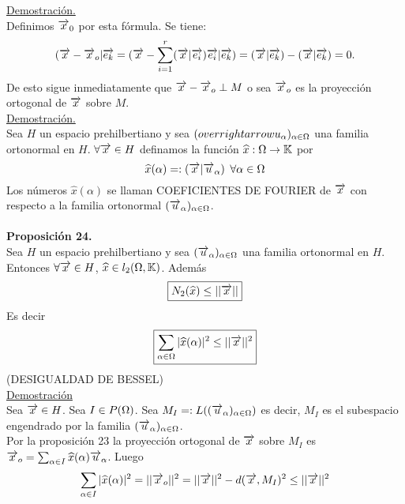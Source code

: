  \underline{Demostración.} \\
 Definimos $\overrightarrow{x}_0$ por esta fórmula. Se tiene:\\
 $$
 (\overrightarrow{x}-\overrightarrow{x}_o | \overrightarrow{e_k}=(\overrightarrow{x} - \sum_{i=1}^{r} (\overrightarrow{x} | \overrightarrow{e_i} )\overrightarrow{e_i} | \overrightarrow{e_k})= ( \overrightarrow{x} |  \overrightarrow{e_k})-(\overrightarrow{x} | \overrightarrow{e_k})=0 .
 $$
 De esto sigue inmediatamente que $\overrightarrow{x}- \overrightarrow{x}_o \perp M$ o sea $\overrightarrow{x}_o$ es la proyección ortogonal de $\overrightarrow{x}$ sobre $M$.
 \\
 \underline{Demostración.}\\
 Sea $H$ un espacio prehilbertiano y sea $(\\overrightarrow{u}_{\alpha})_{\alpha \in \Omega}$ una familia ortonormal en $H$. $\forall \overrightarrow{x} \in H$ definamos la función $\widehat{x}: \Omega \rightarrow \mathbb{K}$ por 
 \begin{equation*}
 \widehat{x}(\alpha)=:(\overrightarrow{x}|\overrightarrow{u}_{\alpha}) \phantom{s} \forall \alpha \in \Omega
 \end{equation*}
 Los números $\widehat{x}(\alpha)$ se llaman COEFICIENTES DE FOURIER de $\overrightarrow{x}$ con respecto a la familia ortonormal $(\overrightarrow{u}_\alpha) _{\alpha \in \Omega}$.\\ \\
 \textbf{Proposición 24.}\\
 Sea $H$ un espacio prehilbertiano y sea $(\overrightarrow{u}_\alpha) _{\alpha \in \Omega}$ una familia ortonormal en $H$. Entonces $\forall \overrightarrow{x} \in H$, $\widehat{x} \in l_2 (\Omega,\mathbb{K})$. Además \\
 \begin{equation*}
 \boxed{N_2(\widehat{x}) \leq || \overrightarrow{x} ||}
 \end{equation*}
 Es decir
  \begin{equation*}
 \boxed{\sum_{\alpha \in \Omega} | \widehat{x} (\alpha) |^2 \leq || \overrightarrow{x} || ^2}
 \end{equation*}
 (DESIGUALDAD DE BESSEL)\\ 
 \underline{Demostración} \\
 Sea $\overrightarrow{x} \in H$. Sea $I \in P(\Omega)$. Sea $M_I=: L((\overrightarrow{u}_\alpha) _{\alpha \in \Omega})$ es decir, $M_I$ es el subespacio engendrado por la familia $(\overrightarrow{u}_\alpha) _{\alpha \in \Omega}$. \\
 Por la proposición 23 la proyección ortogonal de $\overrightarrow{x}$ sobre $M_I$ es $\overrightarrow{x}_o = \sum_{\alpha \in I} \widehat{x} (\alpha) \overrightarrow{u}_{\alpha}$. Luego
 $$
 \sum_{\alpha \in I} | \widehat{x}(\alpha) |^2=|| \overrightarrow{x}_o ||^2=|| \overrightarrow{x} ||^2 - d(\overrightarrow{x},M_I)^2 \leq || \overrightarrow{x} ||^2 
 $$
